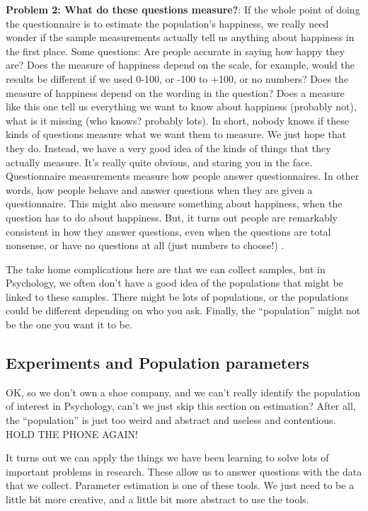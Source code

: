 \documentclass[
]{book}
\begin{document}
\textbf{Problem 2: What do these questions measure?}: If the whole point of doing the questionnaire is to estimate the population's happiness, we really need wonder if the sample measurements actually tell us anything about happiness in the first place. Some questions: Are people accurate in saying how happy they are? Does the measure of happiness depend on the scale, for example, would the results be different if we used 0-100, or -100 to +100, or no numbers? Does the measure of happiness depend on the wording in the question? Does a measure like this one tell us everything we want to know about happiness (probably not), what is it missing (who knows? probably lots). In short, nobody knows if these kinds of questions measure what we want them to measure. We just hope that they do. Instead, we have a very good idea of the kinds of things that they actually measure. It's really quite obvious, and staring you in the face. Questionnaire measurements measure how people answer questionnaires. In other words, how people behave and answer questions when they are given a questionnaire. This might also measure something about happiness, when the question has to do about happiness. But, it turns out people are remarkably consistent in how they answer questions, even when the questions are total nonsense, or have no questions at all (just numbers to choose!) \citet{maul_rethinking_2017}.

The take home complications here are that we can collect samples, but in Psychology, we often don't have a good idea of the populations that might be linked to these samples. There might be lots of populations, or the populations could be different depending on who you ask. Finally, the ``population'' might not be the one you want it to be.

\hypertarget{experiments-and-population-parameters}{%
\subsection{Experiments and Population parameters}\label{experiments-and-population-parameters}}

OK, so we don't own a shoe company, and we can't really identify the population of interest in Psychology, can't we just skip this section on estimation? After all, the ``population'' is just too weird and abstract and useless and contentious. HOLD THE PHONE AGAIN!

It turns out we can apply the things we have been learning to solve lots of important problems in research. These allow us to answer questions with the data that we collect. Parameter estimation is one of these tools. We just need to be a little bit more creative, and a little bit more abstract to use the tools.
\end{document}
